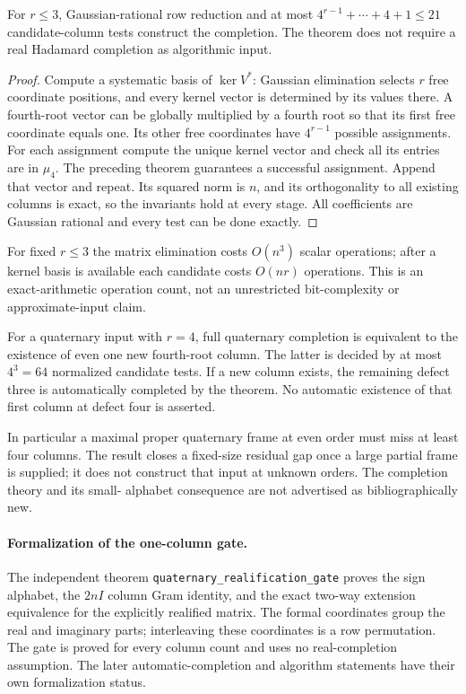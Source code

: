 \begin{theorem}
For $r\le3$, Gaussian-rational row reduction and at most
$4^{r-1}+\cdots+4+1\le21$ candidate-column tests construct the
completion. The theorem does not require a real Hadamard completion
as algorithmic input.
\end{theorem}
\begin{proof}
Compute a systematic basis of $\ker V^*$: Gaussian elimination
selects $r$ free coordinate positions, and every kernel vector is
determined by its values there. A fourth-root vector can be globally
multiplied by a fourth root so that its first free coordinate equals
one. Its other free coordinates have $4^{r-1}$ possible assignments.
For each assignment compute the unique kernel vector and check all
its entries are in $\mu_4$. The preceding theorem guarantees a
successful assignment. Append that vector and repeat. Its squared
norm is $n$, and its orthogonality to all existing columns is exact,
so the invariants hold at every stage. All coefficients are Gaussian
rational and every test can be done exactly.
\end{proof}
For fixed $r\le3$ the matrix elimination costs $O(n^3)$ scalar
operations; after a kernel basis is available each candidate costs
$O(nr)$ operations. This is an exact-arithmetic operation count,
not an unrestricted bit-complexity or approximate-input claim.

\begin{corollary}
For a quaternary input with $r=4$, full quaternary completion is
equivalent to the existence of even one new fourth-root column.
The latter is decided by at most $4^3=64$ normalized candidate tests.
If a new column exists, the remaining defect three is automatically
completed by the theorem. No automatic existence of that first
column at defect four is asserted.
\end{corollary}
In particular a maximal proper quaternary frame at even order must
miss at least four columns. The result closes a fixed-size residual
gap once a large partial frame is supplied; it does not construct
that input at unknown orders. The completion theory and its small-
alphabet consequence are not advertised as bibliographically new.

\paragraph{Formalization of the one-column gate.} The independent theorem \texttt{quaternary\_\allowbreak realification\_\allowbreak gate} proves the sign alphabet, the $2nI$ column Gram identity, and the exact two-way extension equivalence for the explicitly realified matrix. The formal coordinates group the real and imaginary parts; interleaving these coordinates is a row permutation. The gate is proved for every column count and uses no real-completion assumption. The later automatic-completion and algorithm statements have their own formalization status.

